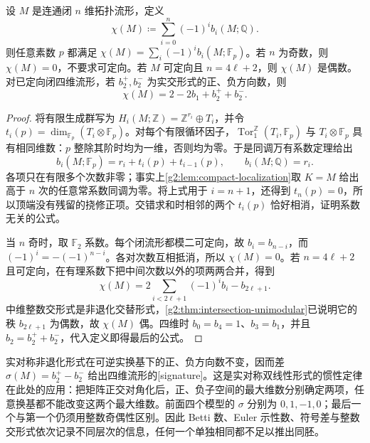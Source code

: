 \begin{proposition}\label{g2:prop:euler-duality-constraints}
	设 \(M\) 是连通闭 \(n\) 维拓扑流形，定义
	\[
		\chi(M)\coloneqq\sum_{i=0}^n(-1)^i b_i(M;\mathbb Q).
	\]
	则任意素数 \(p\) 都满足 \(\chi(M)=\sum_i(-1)^i b_i(M;\mathbb F_p)\)。若 \(n\) 为奇数，则 \(\chi(M)=0\)，不要求可定向。若 \(M\) 可定向且 \(n=4\ell+2\)，则 \(\chi(M)\) 是偶数。对已定向闭四维流形，若 \(b_2^+,b_2^-\) 为实交形式的正、负方向数，则
	\[
		\chi(M)=2-2b_1+b_2^++b_2^-.
	\]
\end{proposition}
\begin{proof}
	将有限生成群写为 \(H_i(M;\mathbb Z)=\mathbb Z^{r_i}\oplus T_i\)，并令 \(t_i(p)=\dim_{\mathbb F_p}(T_i\otimes\mathbb F_p)\)。对每个有限循环因子，\(\operatorname{Tor}_1^{\mathbb Z}(T_i,\mathbb F_p)\) 与 \(T_i\otimes\mathbb F_p\) 具有相同维数：\(p\) 整除其阶时均为一维，否则均为零。于是同调万有系数定理给出
	\[
		b_i(M;\mathbb F_p)=r_i+t_i(p)+t_{i-1}(p),\qquad b_i(M;\mathbb Q)=r_i.
	\]
	各项只在有限多个次数非零；事实上\cref{g2:lem:compact-localization}取 \(K=M\) 给出高于 \(n\) 次的任意常系数同调为零。将上式用于 \(i=n+1\)，还得到 \(t_n(p)=0\)，所以顶端没有残留的挠修正项。交错求和时相邻的两个 \(t_i(p)\) 恰好相消，证明系数无关的公式。

	当 \(n\) 奇时，取 \(\mathbb F_2\) 系数。每个闭流形都模二可定向，故 \(b_i=b_{n-i}\)，而 \((-1)^i=-(-1)^{n-i}\)。各对次数互相抵消，所以 \(\chi(M)=0\)。若 \(n=4\ell+2\) 且可定向，在有理系数下把中间次数以外的项两两合并，得到
	\[
		\chi(M)=2\sum_{i<2\ell+1}(-1)^ib_i-b_{2\ell+1}.
	\]
	中维整数交形式是非退化交替形式，\cref{g2:thm:intersection-unimodular}已说明它的秩 \(b_{2\ell+1}\) 为偶数，故 \(\chi(M)\) 偶。四维时 \(b_0=b_4=1\)、\(b_3=b_1\)，并且 \(b_2=b_2^++b_2^-\)，代入定义即得最后的公式。
\end{proof}

实对称非退化形式在可逆实换基下的正、负方向数不变，因而差 \(\sigma(M)=b_2^+-b_2^-\) 给出四维流形的[signature]。这是实对称双线性形式的惯性定律在此处的应用：把矩阵正交对角化后，正、负子空间的最大维数分别确定两项，任意换基都不能改变这两个最大维数。前面四个模型的 \(\sigma\) 分别为 \(0,1,-1,0\)；最后一个与第一个仍须用整数奇偶性区别。因此 Betti 数、Euler 示性数、符号差与整数交形式依次记录不同层次的信息，任何一个单独相同都不足以推出同胚。
